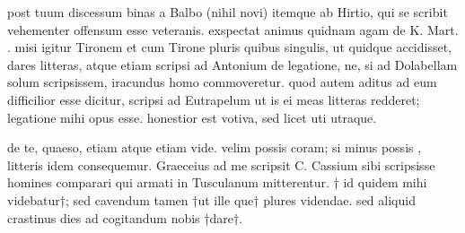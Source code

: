 


 post tuum discessum binas a Balbo (nihil novi) itemque ab Hirtio, qui se scribit vehementer offensum esse veteranis. exspectat animus quidnam agam de K. Mart. . misi igitur Tironem et cum Tirone pluris quibus singulis, ut quidque accidisset, dares litteras, atque etiam scripsi ad Antonium de legatione, ne, si ad Dolabellam solum scripsissem, iracundus homo commoveretur. quod autem aditus ad eum difficilior esse dicitur, scripsi ad Eutrapelum ut is ei meas litteras redderet; legatione mihi opus esse. honestior est votiva, sed licet uti utraque.

 de te, quaeso, etiam atque etiam vide. velim possis coram; si minus possis , litteris idem consequemur. Graeceius ad me scripsit C. Cassium sibi scripsisse homines comparari qui armati in Tusculanum mitterentur. † id quidem mihi videbatur†; sed cavendum tamen †ut ille que† plures videndae. sed aliquid crastinus dies ad cogitandum nobis †dare†.
